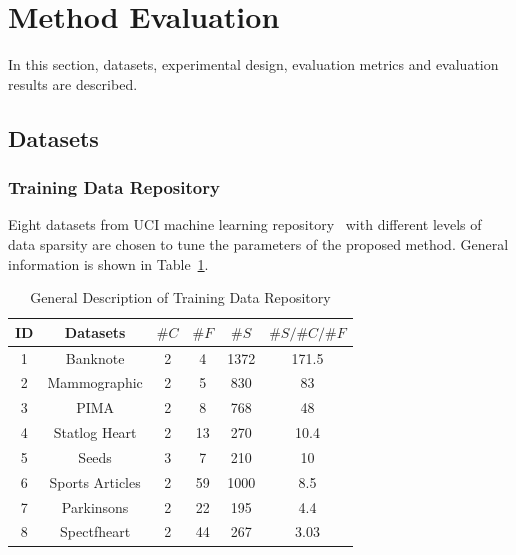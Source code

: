 \documentclass[conference]{IEEEtran}
\begin{document}
\section{Method Evaluation}
In this section, datasets, experimental design, evaluation metrics and evaluation results are described.

\subsection{Datasets}
\subsubsection{\textbf{Training Data Repository}}
Eight datasets from UCI machine learning repository~\cite{Dua:2019} with different levels of data sparsity are chosen to tune the parameters of the proposed method. General information is shown in Table~\ref{data_training}.

\begin{table}[h]
	\centering
	\caption{General Description of Training Data Repository}
	\begin{tabular}{c c c c c c}
		\toprule
		\textbf{ID}   & \textbf{Datasets}  & $\#C$   &   $\#F$           &   $\#S$       &   $ \#S / \#C / \#F$  \\
		\midrule
		1      & Banknote                  & 2                & 4                   & 1372          &    171.5  \\
		2      & Mammographic         & 2                & 5                   & 830           &     83      \\
		3      & PIMA               		& 2                & 8                   & 768           &     48      \\ 
		4      & Statlog Heart      	   & 2                & 13                  & 270          &      10.4   \\ 
		5     & Seeds                         & 3                & 7                    & 210         &      10      \\
		6     & Sports Articles           & 2                & 59                  & 1000        &       8.5    \\
		7   & Parkinsons            	   & 2                & 22                  & 195         &       4.4    \\
		8   & Spectfheart                 & 2                & 44                  & 267         &       3.03  \\ 
		\bottomrule
	\end{tabular}
	\label{data_training}
\end{table}
\end{document}
